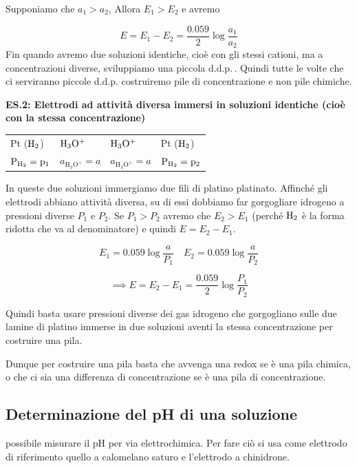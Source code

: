 Supponiamo che $a_1 > a_2$, Allora $E_1 > E_2$ e avremo 

$$E=E_1 - E_2 = \frac{0.059}{2} \log \frac{a_1}{a_2}$$
Fin quando avremo due soluzioni identiche, cioè con gli stessi cationi, ma a concentrazioni diverse, sviluppiamo una piccola d.d.p.\,. Quindi tutte le volte che ci serviranno piccole d.d.p. costruiremo pile di concentrazione e non pile chimiche.

\vspace{0.2cm}\textbf{ES.2: Elettrodi ad attività diversa immersi in soluzioni identiche (cioè con la stessa concentrazione)}

\begin{center}
    \begin{tabular}{p{1.8cm}|p{2cm}||p{2cm}|p{2cm}}
        Pt ($\rm H_2$) & $\rm H_3O^+$ & $\rm H_3O^+$ & Pt ($\rm H_2$)\\[0.5ex]
        $\rm P_{H_2} = p_1$ & $a_{\text{H}_3\text{O}^+}=a$ & $a_{\text{H}_3\text{O}^+}=a$ & $\rm P_{H_2} = p_2$\\[0.5ex]
    \end{tabular}
\end{center}

In queste due soluzioni immergiamo due fili di platino platinato. Affinché gli elettrodi abbiano attività diversa, su di essi dobbiamo far gorgogliare idrogeno a pressioni diverse $P_1$ e $P_2$. Se $P_1>P_2$ avremo che $E_2>E_1$ (perché $\rm H_2$ è la forma ridotta che va al denominatore) e quindi $E= E_2 - E_1$. 

$$E_1 = 0.059 \log \frac{a}{P_1} \quad E_2 = 0.059 \log \frac{a}{P_2}$$

$$\implies E = E_2 - E_1 = \frac{0.059}{2} \log \frac{P_1}{P_2}$$

Quindi basta usare pressioni diverse dei gas idrogeno che gorgogliano sulle due lamine di platino immerse in due soluzioni aventi la stessa concentrazione per costruire una pila.

\vspace{0.2cm}Dunque per costruire una pila basta che avvenga una redox se è una pila chimica, o che ci sia una differenza di concentrazione se è una pila di concentrazione.
\subsection{Determinazione del pH di una soluzione}

\E possibile misurare il pH per via elettrochimica. Per fare ciò si usa come elettrodo di riferimento quello a calomelano saturo e l'elettrodo a chinidrone.

